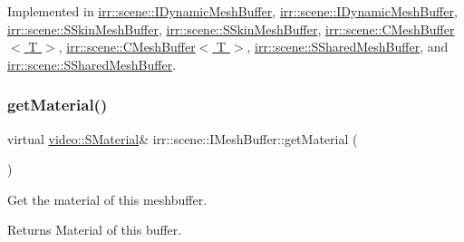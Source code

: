 Implemented in \hyperlink{classirr_1_1scene_1_1IDynamicMeshBuffer_a556d8107ac44cbb16892f54370e32812}{irr\+::scene\+::\+I\+Dynamic\+Mesh\+Buffer}, \hyperlink{classirr_1_1scene_1_1IDynamicMeshBuffer_a556d8107ac44cbb16892f54370e32812}{irr\+::scene\+::\+I\+Dynamic\+Mesh\+Buffer}, \hyperlink{structirr_1_1scene_1_1SSkinMeshBuffer_ada6af60ed1545fd0b3372ddbb71ada5e}{irr\+::scene\+::\+S\+Skin\+Mesh\+Buffer}, \hyperlink{structirr_1_1scene_1_1SSkinMeshBuffer_ada6af60ed1545fd0b3372ddbb71ada5e}{irr\+::scene\+::\+S\+Skin\+Mesh\+Buffer}, \hyperlink{classirr_1_1scene_1_1CMeshBuffer_a34a85f4868776d4cf312cdece5326c89}{irr\+::scene\+::\+C\+Mesh\+Buffer$<$ T $>$}, \hyperlink{classirr_1_1scene_1_1CMeshBuffer_a34a85f4868776d4cf312cdece5326c89}{irr\+::scene\+::\+C\+Mesh\+Buffer$<$ T $>$}, \hyperlink{structirr_1_1scene_1_1SSharedMeshBuffer_a16f7c525acba8d913b8de49dee869465}{irr\+::scene\+::\+S\+Shared\+Mesh\+Buffer}, and \hyperlink{structirr_1_1scene_1_1SSharedMeshBuffer_a16f7c525acba8d913b8de49dee869465}{irr\+::scene\+::\+S\+Shared\+Mesh\+Buffer}.

\mbox{\label{classirr_1_1scene_1_1IMeshBuffer_a26fd922f00fde56abbbbbe40b485238b}} 
\subsubsection{\texorpdfstring{get\+Material()}{getMaterial()}\hspace{0.1cm}{\footnotesize\ttfamily [1/4]}}
{\footnotesize\ttfamily virtual \hyperlink{classirr_1_1video_1_1SMaterial}{video\+::\+S\+Material}\& irr\+::scene\+::\+I\+Mesh\+Buffer\+::get\+Material (\begin{DoxyParamCaption}{ }\end{DoxyParamCaption})\hspace{0.3cm}{\ttfamily [pure virtual]}}



Get the material of this meshbuffer. 

\begin{DoxyReturn}{Returns}
Material of this buffer. 
\end{DoxyReturn}


